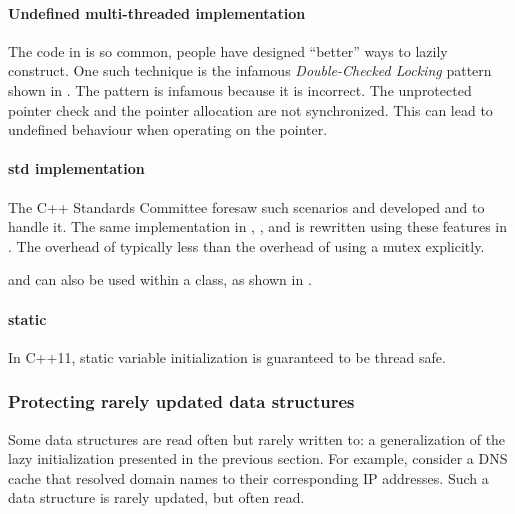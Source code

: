 

\paragraph{Undefined multi-threaded implementation}
The code in  is so common, people have designed ``better'' ways to lazily construct. One such technique is the infamous \emph{Double-Checked Locking} pattern shown in . The pattern is infamous because it is incorrect. The unprotected pointer check and the pointer allocation are not synchronized. This can lead to undefined behaviour when operating on the pointer. 


\paragraph{std implementation}
The C++ Standards Committee foresaw such scenarios and developed  and  to handle it. The same implementation in , , and  is rewritten using these features in . The overhead of  typically less than the overhead of using a mutex explicitly.


 and  can also be used within a class, as shown in .


\paragraph{static}
In C++11, static variable initialization is guaranteed to be thread safe.

\subsubsection{Protecting rarely updated data structures}
Some data structures are read often but rarely written to: a generalization of the lazy initialization presented in the previous section. For example, consider a DNS cache that resolved domain names to their corresponding IP addresses. Such a data structure is rarely updated, but often read. 

